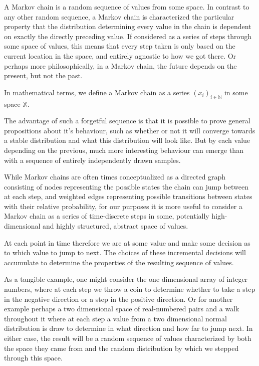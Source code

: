 A Markov chain is a random sequence of values from some space. In contrast to any other random sequence, a Markov chain is characterized the particular property that the distribution determining every value in the chain is dependent on exactly the directly preceding value. If considered as a series of steps through some space of values, this means that every step taken is only based on the current location in the space, and entirely agnostic to how we got there. Or perhaps more philosophically, in a Markov chain, the future depends on the present, but not the past.

In mathematical terms, we define a Markov chain as a series $(x_i)_{i \in \mathbb{N}}$ in some space $\mathbb{X}$. 

The advantage of such a forgetful sequence is that it is possible to prove general propositions about it's behaviour, such as whether or not it will converge towards a stable distribution and what this distribution will look like. But by each value depending on the previous, much more interesting behaviour can emerge than with a sequence of entirely independently drawn samples.

While Markov chains are often times conceptualized as a directed graph consisting of nodes representing the possible states the chain can jump between at each step, and weighted edges representing possible transitions between states with their relative probability, for our purposes it is more useful to consider a Markov chain as a series of time-discrete steps in some, potentially high-dimensional and highly structured, abstract space of values.

At each point in time therefore we are at some value and make some decision as to which value to jump to next. The choices of these incremental decisions will accumulate to determine the properties of the resulting sequence of values.

As a tangible example, one might consider the one dimensional array of integer numbers, where at each step we throw a coin to determine whether to take a step in the negative direction or a step in the positive direction. Or for another example perhaps a two dimensional space of real-numbered pairs and a walk throughout it where at each step a value from a two dimensional normal distribution is draw to determine in what direction and how far to jump next. In either case, the result will be a random sequence of values characterized by both the space they came from and the random distribution by which we stepped through this space.